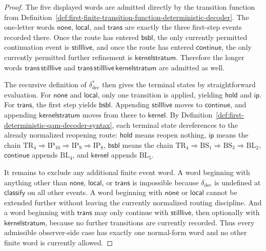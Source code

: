 \begin{proof}
The five displayed words are admitted directly by the transition function from Definition~\ref{def:first-finite-transition-function-deterministic-decoder}. The one-letter words \(\mathsf{none}\), \(\mathsf{local}\), and \(\mathsf{trans}\) are exactly the three first-step events recorded there. Once the route has entered \(\mathsf{bsbl}\), the only currently permitted continuation event is \(\mathsf{stilllive}\), and once the route has entered \(\mathsf{continue}\), the only currently permitted further refinement is \(\mathsf{kernelstratum}\). Therefore the longer words \(\mathsf{trans}\,\mathsf{stilllive}\) and \(\mathsf{trans}\,\mathsf{stilllive}\,\mathsf{kernelstratum}\) are admitted as well.

The recursive definition of \(\delta^{\ast}_{\mathrm{dec}}\) then gives the terminal states by straightforward evaluation. For \(\mathsf{none}\) and \(\mathsf{local}\), only one transition is applied, yielding \(\mathsf{hold}\) and \(\mathsf{ip}\). For \(\mathsf{trans}\), the first step yields \(\mathsf{bsbl}\). Appending \(\mathsf{stilllive}\) moves to \(\mathsf{continue}\), and appending \(\mathsf{kernelstratum}\) moves from there to \(\mathsf{kernel}\). By Definition~\ref{def:first-deterministic-qam-decoder-syntax}, each terminal state dereferences to the already normalized reopening route: \(\mathsf{hold}\) means reopen nothing, \(\mathsf{ip}\) means the chain \(\mathrm{TR}_4\Rightarrow \mathrm{IP}_{10}\Rightarrow \mathrm{IP}_9\Rightarrow \mathrm{IP}_8\), \(\mathsf{bsbl}\) means the chain \(\mathrm{TR}_4\Rightarrow \mathrm{BS}_1\Rightarrow \mathrm{BS}_3\Rightarrow \mathrm{BL}_2\), \(\mathsf{continue}\) appends \(\mathrm{BL}_4\), and \(\mathsf{kernel}\) appends \(\mathrm{BL}_5\).

It remains to exclude any additional finite event word. A word beginning with anything other than \(\mathsf{none}\), \(\mathsf{local}\), or \(\mathsf{trans}\) is impossible because \(\delta_{\mathrm{dec}}\) is undefined at \(\mathsf{classify}\) on all other events. A word beginning with \(\mathsf{none}\) or \(\mathsf{local}\) cannot be extended further without leaving the currently normalized routing discipline. And a word beginning with \(\mathsf{trans}\) may only continue with \(\mathsf{stilllive}\), then optionally with \(\mathsf{kernelstratum}\), because no further transitions are currently recorded. Thus every admissible observer-side case has exactly one normal-form word and no other finite word is currently allowed.
\end{proof}

